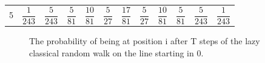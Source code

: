 \documentclass[a0,portrait]{a0poster}
\begin{document}
\begin{center}
{\begin{center}
\begin{tabular}{|c||c|c|c|c|c|c|c|c|c|c|c|}
\hspace*{\fill} \\
\hline 
5 & 
\hspace*{\fill} $\dfrac{1}{243}$ \hspace*{\fill} & 
$\dfrac{ 5 }{ 243 }$ & 
\hspace*{\fill} $\dfrac{5}{81}$ \hspace*{\fill} & 
$\dfrac{ 10 }{ 81 }$ & 
\hspace*{\fill} $\dfrac{5}{27}$ \hspace*{\fill} & 
$\dfrac{ 17 }{ 81 }$ & 
\hspace*{\fill} $\dfrac{5}{27}$ \hspace*{\fill} & 
$\dfrac{ 10 }{ 81 }$ & 
\hspace*{\fill} $\dfrac{5}{81}$ \hspace*{\fill} & 
$\dfrac{ 5 }{ 243 }$ & 
\hspace*{\fill} $\dfrac{1}{243}$ \hspace*{\fill} \\
\hline 
\end{tabular}
\end{center}

\begin{figure}
\caption{The probability of being at position i after T steps of the lazy classical random walk on the line starting in 0.}
\label{clas2_ti}
\end{figure}    

}
\end{center}
\end{document}
